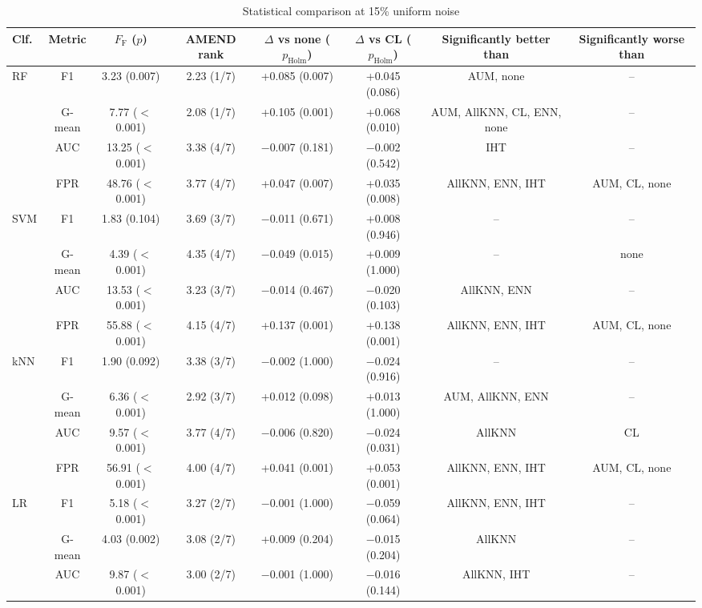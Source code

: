 \documentclass[conference]{IEEEtran}
\begin{document}
\begin{table}[!t]
\centering
\footnotesize
\caption{Statistical comparison at 15\% uniform noise}
\label{tab:4}
\setlength{\tabcolsep}{3.5pt}
\begin{adjustbox}{max width=\linewidth}
\begin{tabular}{lccccccc}
\hline
Clf. & Metric & $F_{\mathrm{F}}$ ($p$) & AMEND rank & $\Delta $ vs none ($p_{\mathrm{Holm}}$) & $\Delta $ vs CL ($p_{\mathrm{Holm}}$) & Significantly better than & Significantly worse than \\
\hline
RF & F1 & 3.23 (0.007) & 2.23 (1/7) & +0.085 (0.007) & +0.045 (0.086) & AUM, none & -- \\
& G-mean & 7.77 ($<$0.001) & 2.08 (1/7) & +0.105 (0.001) & +0.068 (0.010) & AUM, AllKNN, CL, ENN, none & -- \\
& AUC & 13.25 ($<$0.001) & 3.38 (4/7) & $-$0.007 (0.181) & $-$0.002 (0.542) & IHT & -- \\
& FPR & 48.76 ($<$0.001) & 3.77 (4/7) & +0.047 (0.007) & +0.035 (0.008) & AllKNN, ENN, IHT & AUM, CL, none \\
SVM & F1 & 1.83 (0.104) & 3.69 (3/7) & $-$0.011 (0.671) & +0.008 (0.946) & -- & -- \\
& G-mean & 4.39 ($<$0.001) & 4.35 (4/7) & $-$0.049 (0.015) & +0.009 (1.000) & -- & none \\
& AUC & 13.53 ($<$0.001) & 3.23 (3/7) & $-$0.014 (0.467) & $-$0.020 (0.103) & AllKNN, ENN & -- \\
& FPR & 55.88 ($<$0.001) & 4.15 (4/7) & +0.137 (0.001) & +0.138 (0.001) & AllKNN, ENN, IHT & AUM, CL, none \\
kNN & F1 & 1.90 (0.092) & 3.38 (3/7) & $-$0.002 (1.000) & $-$0.024 (0.916) & -- & -- \\
& G-mean & 6.36 ($<$0.001) & 2.92 (3/7) & +0.012 (0.098) & +0.013 (1.000) & AUM, AllKNN, ENN & -- \\
& AUC & 9.57 ($<$0.001) & 3.77 (4/7) & $-$0.006 (0.820) & $-$0.024 (0.031) & AllKNN & CL \\
& FPR & 56.91 ($<$0.001) & 4.00 (4/7) & +0.041 (0.001) & +0.053 (0.001) & AllKNN, ENN, IHT & AUM, CL, none \\
LR & F1 & 5.18 ($<$0.001) & 3.27 (2/7) & $-$0.001 (1.000) & $-$0.059 (0.064) & AllKNN, ENN, IHT & -- \\
& G-mean & 4.03 (0.002) & 3.08 (2/7) & +0.009 (0.204) & $-$0.015 (0.204) & AllKNN & -- \\
& AUC & 9.87 ($<$0.001) & 3.00 (2/7) & $-$0.001 (1.000) & $-$0.016 (0.144) & AllKNN, IHT & -- \\

\end{tabular}
\end{adjustbox}
\end{table}
\end{document}
